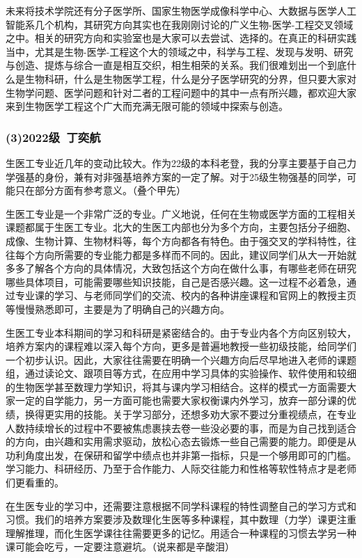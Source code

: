 \documentclass[11pt,oneside]{book}
\begin{document}
未来将技术学院还有分子医学所、国家生物医学成像科学中心、大数据与医学人工智能系几个机构，其研究方向其实也在我刚刚讨论的广义生物-医学-工程交叉领域之中。相关的研究方向和实验室也是大家可以去尝试、选择的。在真正的科研实践当中，尤其是生物-医学-工程这个大的领域之中，科学与工程、发现与发明、研究与创造、提炼与综合一直是相互交织，相生相荣的关系。我们很难划出一个到底什么是生物科研，什么是生物医学工程，什么是分子医学研究的分界，但只要大家对生物学问题、医学问题和针对二者的工程问题中的其中一点有所兴趣，都欢迎大家来到生物医学工程这个广大而充满无限可能的领域中探索与创造。

\subsubsection{(3)2022级\ 丁奕航}

生医工专业近几年的变动比较大。作为22级的本科老登，我的分享主要基于自己力学强基的身份，兼有对非强基培养方案的一定了解。对于25级生物强基的同学，可能只在部分方面有参考意义。（叠个甲先）

生医工专业是一个非常广泛的专业。广义地说，任何在生物或医学方面的工程相关课题都属于生医工专业。北大的生医工内部也分为多个方向，主要包括分子细胞、成像、生物计算、生物材料等，每个方向都各有特色。由于强交叉的学科特性，往往每个方向所需要的专业能力都是多样而不同的。因此，建议同学们从大一开始就多多了解各个方向的具体情况，大致包括这个方向在做什么事，有哪些老师在研究哪些具体项目，可能需要哪些知识技能，自己是否感兴趣。这一过程不必着急，通过专业课的学习、与老师同学们的交流、校内的各种讲座课程和官网上的教授主页等慢慢熟悉即可，主要是为了明确自己的兴趣方向。

生医工专业本科期间的学习和科研是紧密结合的。由于专业内各个方向区别较大，培养方案内的课程难以深入每个方向，更多是普遍地教授一些初级技能，给同学们一个初步认识。因此，大家往往需要在明确一个兴趣方向后尽早地进入老师的课题组，通过读论文、跟项目等方式，在应用中学习具体的实验操作、软件使用和较细的生物医学甚至数理力学知识，将其与课内学习相结合。这样的模式一方面需要大家一定的自学能力，另一方面可能也需要大家权衡课内外学习，放弃一部分课的优绩，换得更实用的技能。关于学习部分，还想多劝大家不要过分重视绩点，在专业人数持续增长的过程中不要被焦虑裹挟去卷一些没必要的事，而是为自己找到适合的方向，由兴趣和实用需求驱动，放松心态去锻炼一些自己需要的能力。即便是从功利角度出发，在保研和留学中绩点也并非第一指标，只是一个够用即可的门槛。学习能力、科研经历、乃至于合作能力、人际交往能力和性格等软性特点才是老师们更看重的。

在生医专业的学习中，还需要注意根据不同学科课程的特性调整自己的学习方式和习惯。我们的培养方案要涉及数理化生医等多种课程，其中数理（力学）课更注重理解推理，而化生医学课往往需要更多的记忆。用适合一种课程的习惯去学另一种课可能会吃亏，一定要注意避坑。（说来都是辛酸泪）
\end{document}
